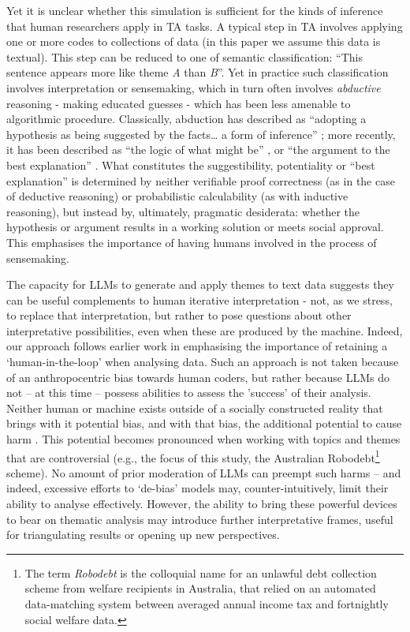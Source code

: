 \documentclass{article}
\begin{document}
Yet it is unclear whether this simulation is sufficient for the kinds of inference that human researchers apply in TA tasks. A typical step in TA involves applying one or more codes to collections of data (in this paper we assume this data is textual). This step can be reduced to one of semantic classification: ``This sentence appears more like theme \emph{A} than \emph{B}''. Yet in practice such classification involves interpretation or sensemaking, which in turn often involves \emph{abductive} reasoning \cite{kolkoAbductiveThinkingSensemaking2010} - making educated guesses - which has been less amenable to algorithmic procedure. Classically, abduction has described as ``adopting a hypothesis as being suggested by the facts\ldots{} a form of inference'' \cite{peirceLogicDrawingHistory1998}; more recently, it has been described as ``the logic of what might be'' \cite{dunneDesignThinkingHow2006}, or ``the argument to the best explanation'' \cite{kolkoAbductiveThinkingSensemaking2010}. What constitutes the suggestibility, potentiality or ``best explanation'' is determined by neither verifiable proof correctness (as in the case of deductive reasoning) or probabilistic calculability (as with inductive reasoning), but instead by, ultimately, pragmatic desiderata: whether the hypothesis or argument results in a working solution or meets social approval. This emphasises the importance of having humans involved in the process of sensemaking. 

The capacity for LLMs to generate and apply themes to text data suggests they can be useful complements to human iterative interpretation - not, as we stress, to replace that interpretation, but rather to pose questions about other interpretative possibilities, even when these are produced by the machine. Indeed, our approach follows earlier work \cite{dai2023llm, depaoliPerformingInductiveThematic2023, zhang2023redefining} in emphasising the importance of retaining a `human-in-the-loop' when analysing data. Such an approach is not taken because of an anthropocentric bias towards human coders, but rather because LLMs do not – at this time – possess abilities to assess the 'success' of their analysis. Neither human or machine exists outside of a socially constructed reality that brings with it potential bias, and with that bias, the additional potential to cause harm \cite{watt2024picture}. This potential becomes pronounced when working with topics and themes that are controversial (e.g., the focus of this study, the Australian Robodebt\footnote{The term \emph{Robodebt} is the colloquial name for an unlawful debt collection scheme from welfare recipients in Australia, that relied on an automated data-matching system between averaged annual income tax and fortnightly social welfare data.} scheme). No amount of prior moderation of LLMs can preempt such harms – and indeed, excessive efforts to `de-bias' models may, counter-intuitively, limit their ability to analyse effectively. However, the ability to bring these powerful devices to bear on thematic analysis may introduce further interpretative frames, useful for triangulating results or opening up new perspectives. 
\end{document}
